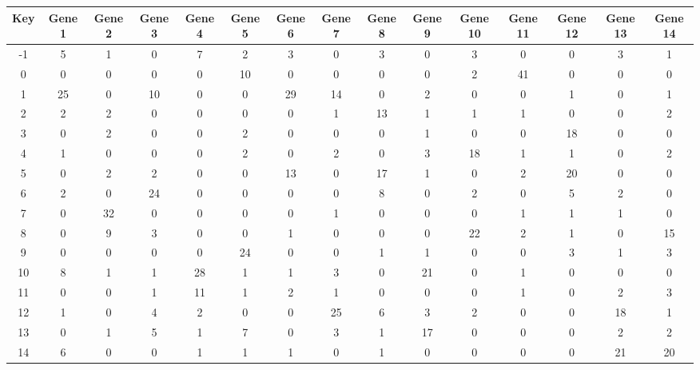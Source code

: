 \begin{tabular}{|c|c|c|c|c|c|c|c|c|c|c|c|c|c|c|}
\hline
Key & Gene 1 & Gene 2 & Gene 3 & Gene 4 & Gene 5 & Gene 6 & Gene 7 & Gene 8 & Gene 9 & Gene 10 & Gene 11 & Gene 12 & Gene 13 & Gene 14 \\
\hline
-1 & 5 & 1 & 0 & 7 & 2 & 3 & 0 & 3 & 0 & 3 & 0 & 0 & 3 & 1 \\
0 & 0 & 0 & 0 & 0 & 10 & 0 & 0 & 0 & 0 & 2 & 41 & 0 & 0 & 0 \\
1 & 25 & 0 & 10 & 0 & 0 & 29 & 14 & 0 & 2 & 0 & 0 & 1 & 0 & 1 \\
2 & 2 & 2 & 0 & 0 & 0 & 0 & 1 & 13 & 1 & 1 & 1 & 0 & 0 & 2 \\
3 & 0 & 2 & 0 & 0 & 2 & 0 & 0 & 0 & 1 & 0 & 0 & 18 & 0 & 0 \\
4 & 1 & 0 & 0 & 0 & 2 & 0 & 2 & 0 & 3 & 18 & 1 & 1 & 0 & 2 \\
5 & 0 & 2 & 2 & 0 & 0 & 13 & 0 & 17 & 1 & 0 & 2 & 20 & 0 & 0 \\
6 & 2 & 0 & 24 & 0 & 0 & 0 & 0 & 8 & 0 & 2 & 0 & 5 & 2 & 0 \\
7 & 0 & 32 & 0 & 0 & 0 & 0 & 1 & 0 & 0 & 0 & 1 & 1 & 1 & 0 \\
8 & 0 & 9 & 3 & 0 & 0 & 1 & 0 & 0 & 0 & 22 & 2 & 1 & 0 & 15 \\
9 & 0 & 0 & 0 & 0 & 24 & 0 & 0 & 1 & 1 & 0 & 0 & 3 & 1 & 3 \\
10 & 8 & 1 & 1 & 28 & 1 & 1 & 3 & 0 & 21 & 0 & 1 & 0 & 0 & 0 \\
11 & 0 & 0 & 1 & 11 & 1 & 2 & 1 & 0 & 0 & 0 & 1 & 0 & 2 & 3 \\
12 & 1 & 0 & 4 & 2 & 0 & 0 & 25 & 6 & 3 & 2 & 0 & 0 & 18 & 1 \\
13 & 0 & 1 & 5 & 1 & 7 & 0 & 3 & 1 & 17 & 0 & 0 & 0 & 2 & 2 \\
14 & 6 & 0 & 0 & 1 & 1 & 1 & 0 & 1 & 0 & 0 & 0 & 0 & 21 & 20 \\
\hline
\end{tabular}